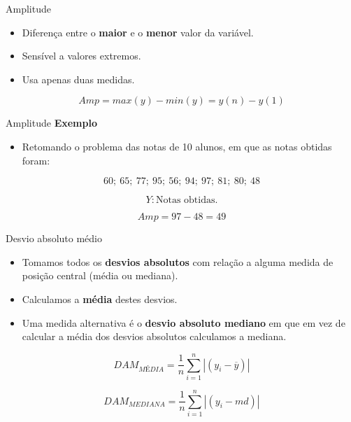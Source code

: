 \documentclass[
  ignorenonframetext,
  serif,
  professionalfont,
  usenames,
  dvipsnames,
  aspectratio = 169]{beamer}
\providecommand{\tightlist}{%
  \setlength{\itemsep}{0pt}\setlength{\parskip}{0pt}}
\renewcommand{\tightlist}{%
  \setlength{\itemsep}{0\baselineskip}
  \setlength{\parskip}{0.25\baselineskip}
}
\def\beginAHalfColumn{\begin{minipage}{0.49\textwidth}}%
\def\endColumns{\end{minipage}}%
\begin{document}
\begin{frame}{Amplitude}
\label{amplitude}
\begin{itemize}
\tightlist
\item
  Diferença entre o \textbf{maior} e o \textbf{menor} valor da variável.
\item
  Sensível a valores extremos.
\item
  Usa apenas duas medidas.
\end{itemize}

\[Amp = max(y) - min(y) = y(n) - y(1)\]
\end{frame}

\begin{frame}{Amplitude}
\label{amplitude-1}
\textbf{Exemplo}

\begin{itemize}
\tightlist
\item
  Retomando o problema das notas de 10 alunos, em que as notas obtidas
  foram:
\end{itemize}

\[60;\ 65;\ 77;\ 95;\ 56;\ 94;\ 97;\ 81;\ 80;\ 48\]

\[Y: \text{Notas obtidas.}\]

\[Amp = 97 - 48  = 49\]
\end{frame}

\begin{frame}{Desvio absoluto médio}
\label{desvio-absoluto-muxe9dio}
\begin{itemize}
\tightlist
\item
  Tomamos todos os \textbf{desvios absolutos} com relação a alguma
  medida de posição central (média ou mediana).
\item
  Calculamos a \textbf{média} destes desvios.
\item
  Uma medida alternativa é o \textbf{desvio absoluto mediano} em que em
  vez de calcular a média dos desvios absolutos calculamos a mediana.
\end{itemize}

\vspace{1cm}

\beginAHalfColumn

\[
DAM_{MÉDIA} = \frac{1}{n}
      \sum_{i = 1}^n |(y_i - \overline{y})|
\]

\endColumns
\beginAHalfColumn

\[
DAM_{MEDIANA} =
      \frac{1}{n} \sum_{i = 1}^n |(y_i - md)|
\]

\endColumns
\end{frame}
\end{document}
